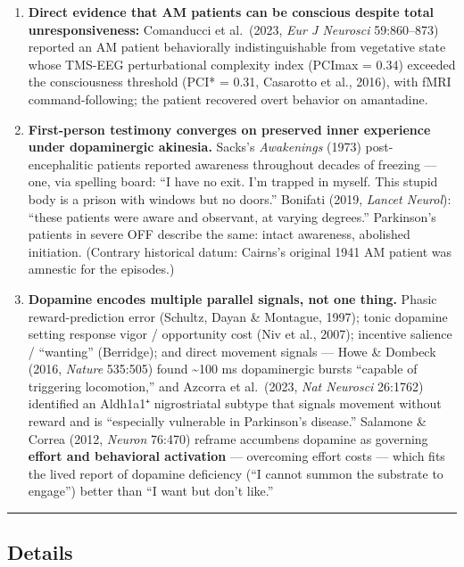\begin{enumerate}
\item
  \textbf{Direct evidence that AM patients can be conscious despite total unresponsiveness:} Comanducci et al.~(2023, \emph{Eur J Neurosci} 59:860--873) reported an AM patient behaviorally indistinguishable from vegetative state whose TMS-EEG perturbational complexity index (PCImax = 0.34) exceeded the consciousness threshold (PCI* = 0.31, Casarotto et al., 2016), with fMRI command-following; the patient recovered overt behavior on amantadine.
\item
  \textbf{First-person testimony converges on preserved inner experience under dopaminergic akinesia.} Sacks's \emph{Awakenings} (1973) post-encephalitic patients reported awareness throughout decades of freezing --- one, via spelling board: ``I have no exit. I'm trapped in myself. This stupid body is a prison with windows but no doors.'' Bonifati (2019, \emph{Lancet Neurol}): ``these patients were aware and observant, at varying degrees.'' Parkinson's patients in severe OFF describe the same: intact awareness, abolished initiation. (Contrary historical datum: Cairns's original 1941 AM patient was amnestic for the episodes.)
\item
  \textbf{Dopamine encodes multiple parallel signals, not one thing.} Phasic reward-prediction error (Schultz, Dayan \& Montague, 1997); tonic dopamine setting response vigor / opportunity cost (Niv et al., 2007); incentive salience / ``wanting'' (Berridge); and direct movement signals --- Howe \& Dombeck (2016, \emph{Nature} 535:505) found \textasciitilde100 ms dopaminergic bursts ``capable of triggering locomotion,'' and Azcorra et al.~(2023, \emph{Nat Neurosci} 26:1762) identified an Aldh1a1⁺ nigrostriatal subtype that signals movement without reward and is ``especially vulnerable in Parkinson's disease.'' Salamone \& Correa (2012, \emph{Neuron} 76:470) reframe accumbens dopamine as governing \textbf{effort and behavioral activation} --- overcoming effort costs --- which fits the lived report of dopamine deficiency (``I cannot summon the substrate to engage'') better than ``I want but don't like.''
\end{enumerate}

\begin{center}\rule{0.5\linewidth}{0.5pt}\end{center}

\subsection{Details}\label{02_dopamine_action-details}

